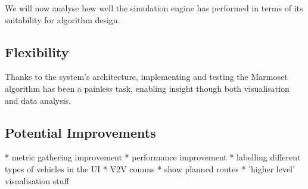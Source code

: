 \documentclass[ %
                    author={Alexander Hill},
                supervisor={Dr. Benjamin Sach},
                    degree={MEng},
                     title={MARMOSET},
                  subtitle={Multi-Agent Route Management using Online Simulation for Efficient Transportation},
                      type={research},
                      year={2016} ]{dissertation}
\begin{document}
We will now analyse how well the simulation engine has performed in terms
of its suitability for algorithm design.

\subsection{Flexibility}

Thanks to the system's architecture, implementing and testing the Marmoset
algorithm has been a painless task, enabling insight though both visualisation
and data analysis.

\subsection{Potential Improvements}

* metric gathering improvement
* performance improvement
* labelling different types of vehicles in the UI
* V2V comms
* show planned routes
* 'higher level' visualisation stuff




\end{document}
